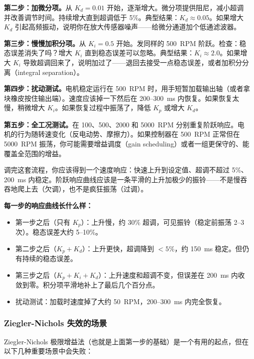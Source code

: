 \textbf{第二步：加微分项。}从 $K_d = 0.01$ 开始，逐渐增大。微分项提供阻尼，减小超调并改善调节时间。持续增大直到超调低于 5\%。典型结果：$K_d \approx 0.05$。如果增大 $K_d$ 引起高频振动，说明你在放大传感器噪声——给微分通道加个低通滤波器。

\textbf{第三步：慢慢加积分项。}从 $K_i = 0.5$ 开始。发同样的 500~RPM 阶跃。检查：稳态误差消失了吗？增大 $K_i$ 直到稳态误差可以忽略。典型结果：$K_i \approx 2.0$。如果增大 $K_i$ 导致超调回来了，说明加过了——退回去接受一点稳态误差，或者加积分分离（integral separation）。

\textbf{第四步：扰动测试。}电机稳定运行在 500~RPM 时，用手短暂加载输出轴（或者拿块橡皮按住输出端）。速度应该掉一下然后在 200--300~ms 内恢复。如果恢复太慢，稍微增大 $K_i$。如果恢复过程中振荡了，降低 $K_p$ 或增大 $K_d$。

\textbf{第五步：全工况测试。}在 100、500、2000 和 5000~RPM 分别重复阶跃响应。电机的行为随转速变化（反电动势、摩擦力）。如果控制器在 500~RPM 正常但在 5000~RPM 振荡，你可能需要增益调度（gain scheduling）或者一组更保守的、能覆盖全范围的增益。

调完这套流程，你应该得到一个速度响应：快速上升到设定值、超调不超过 5\%、200~ms 内稳定。阶跃响应曲线应该是一条平滑的上升加极少的振铃——不是慢吞吞地爬上去（欠调），也不是疯狂振荡（过调）。

\textbf{每一步的响应曲线长什么样：}
\begin{itemize}
    \item 第一步之后（只有 $K_p$）：上升慢，约 30\% 超调，可见振铃（稳定前振荡 2--3 次）。稳态误差大约 5--10\%。
    \item 第二步之后（$K_p + K_d$）：上升更快，超调降到 $<5\%$，约 150~ms 稳定。但仍有持续的稳态误差。
    \item 第三步之后（$K_p + K_i + K_d$）：上升速度和超调不变，但误差在 200~ms 内收敛到零。积分项平滑地补上了最后几个百分点。
    \item 扰动测试：加载时速度掉了大约 50~RPM，200--300~ms 内完全恢复。
\end{itemize}

\subsubsection{Ziegler-Nichols 失效的场景}

Ziegler-Nichols 极限增益法（也就是上面第一步的基础）是一个有用的起点，但在以下几种重要场景中会失败：

